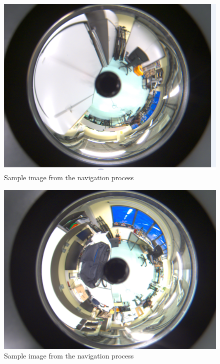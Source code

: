\documentclass[11pt, a4paper, openany]{book}
\begin{document}
  \begin{figure}[H]
    \centering
    \includegraphics[scale=0.3]{Labbot&ele/obs1.png}
    \caption{Sample image from the navigation process}
    \label{fig:print} 
\end{figure}
  \begin{figure}[H]
    \centering
    \includegraphics[scale=0.3]{Labbot&ele/obs2.png}
    \caption{Sample image from the navigation process}
    \label{fig:print} 
\end{figure}
\end{document}
